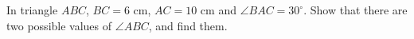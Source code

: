 In triangle $ABC$, $BC=6$ cm, $AC=10$ cm and $\angle BAC=30^\circ$. Show that there are two possible values of $\angle ABC$, and find them.

